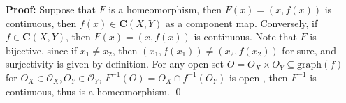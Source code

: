 \documentclass[12pt]{article}
\begin{document}
\textbf{Proof:} Suppose that $F$ is a homeomorphism, then $F(x)=(x,f(x))$ is continuous, then $f(x)\in\textbf{C}(X,Y)$ as a component map. Conversely, if $f\in\textbf{C}(X,Y)$, then $F(x)=(x,f(x))$ is continuous. Note that $F$ is bijective, since if $x_1\neq x_2$, then $(x_1,f(x_1))\neq (x_2,f(x_2))$ for sure, and surjectivity is given by definition. For any open set $O=O_{X}\times O_{Y}\subseteq \text{graph}(f)$ for $O_{X}\in\mathcal{O}_{X}, O_{Y}\in\mathcal{O}_{Y}$, $F^{-1}(O)=O_{X}\cap f^{-1}(O_{Y})$ is open , then $F^{-1}$ is continuous, thus is a homeomorphism. \qed
\end{document}

